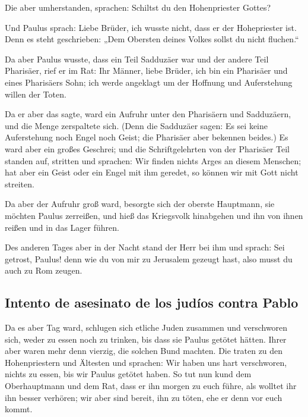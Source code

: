  Die aber umherstanden, sprachen: Schiltst du den
Hohenpriester Gottes?

 Und Paulus sprach: Liebe Brüder, ich wusste nicht, dass
er der Hohepriester ist. Denn es steht geschrieben: „Dem Obersten deines
Volkes sollst du nicht fluchen.``

 Da aber Paulus wusste, dass ein Teil Sadduzäer war und
der andere Teil Pharisäer, rief er im Rat: Ihr Männer, liebe Brüder, ich
bin ein Pharisäer und eines Pharisäers Sohn; ich werde angeklagt um der
Hoffnung und Auferstehung willen der Toten.

 Da er aber das sagte, ward ein Aufruhr unter den
Pharisäern und Sadduzäern, und die Menge zerspaltete sich.
 (Denn die Sadduzäer sagen: Es sei keine Auferstehung noch
Engel noch Geist; die Pharisäer aber bekennen beides.)  Es
ward aber ein großes Geschrei; und die Schriftgelehrten von der
Pharisäer Teil standen auf, stritten und sprachen: Wir finden nichts
Arges an diesem Menschen; hat aber ein Geist oder ein Engel mit ihm
geredet, so können wir mit Gott nicht streiten.

 Da aber der Aufruhr groß ward, besorgte sich der oberste
Hauptmann, sie möchten Paulus zerreißen, und hieß das Kriegsvolk
hinabgehen und ihn von ihnen reißen und in das Lager führen.

 Des anderen Tages aber in der Nacht stand der Herr bei
ihm und sprach: Sei getrost, Paulus! denn wie du von mir zu Jerusalem
gezeugt hast, also musst du auch zu Rom zeugen.

\hypertarget{intento-de-asesinato-de-los-juduxedos-contra-pablo}{%
\subsection{Intento de asesinato de los judíos contra
Pablo}\label{intento-de-asesinato-de-los-juduxedos-contra-pablo}}

 Da es aber Tag ward, schlugen sich etliche Juden
zusammen und verschworen sich, weder zu essen noch zu trinken, bis dass
sie Paulus getötet hätten.  Ihrer aber waren mehr denn
vierzig, die solchen Bund machten.  Die traten zu den
Hohenpriestern und Ältesten und sprachen: Wir haben uns hart
verschworen, nichts zu essen, bis wir Paulus getötet haben.
 So tut nun kund dem Oberhauptmann und dem Rat, dass er
ihn morgen zu euch führe, als wolltet ihr ihn besser verhören; wir aber
sind bereit, ihn zu töten, ehe er denn vor euch kommt.

